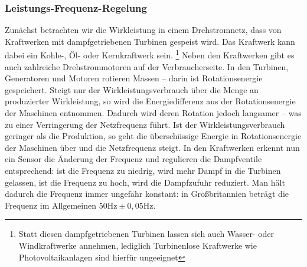 \subsubsection{Leistungs-Frequenz-Regelung}
Zunächst betrachten wir die Wirkleistung in einem Drehstromnetz, dass von Kraftwerken mit dampfgetriebenen Turbinen gespeist wird. Das Kraftwerk kann dabei ein Kohle-, Öl- oder Kernkraftwerk sein. \footnote{Statt diesen dampfgetriebenen Turbinen lassen sich auch Wasser- oder Windkraftwerke annehmen, lediglich Turbinenlose Kraftwerke wie Photovoltaikanlagen sind hierfür ungeeignet} %
Neben den Kraftwerken gibt es auch zahlreiche Drehstrommotoren auf der \q Verbraucherseite\q. %
In den Turbinen, Generatoren und Motoren rotieren Massen – darin ist Rotationsenergie gespeichert.
Steigt nur der Wirkleistungsverbrauch über die Menge an produzierter Wirkleistung, so wird die Energiedifferenz aus der Rotationsenergie der Maschinen entnommen.\cite{Harrison}
Dadurch wird deren Rotation jedoch langsamer – was zu einer Verringerung der Netzfrequenz führt.
Ist der Wirkleistungsverbrauch geringer als die Produktion, so geht die überschüssige Energie in Rotationsenergie der Maschinen über und die Netzfrequenz steigt.
In den Kraftwerken erkennt nun ein Sensor die Änderung der Frequenz und regulieren die Dampfventile entsprechend:
ist die Frequenz zu niedrig, wird mehr Dampf in die Turbinen gelassen, ist die Frequenz zu hoch, wird die Dampfzufuhr reduziert.
Man hält dadurch die Frequenz immer ungefähr konstant: in Großbritannien beträgt die Frequenz im Allgemeinen $50 \mathrm{Hz} \pm 0,05 \mathrm{Hz}$.\cite{Harrison} %

